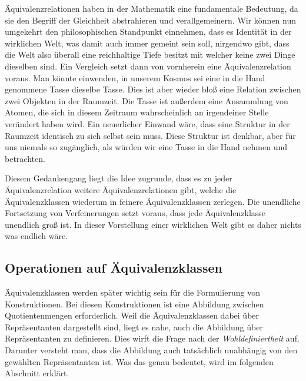 Äquivalenzrelationen haben in der Mathematik eine fundamentale
Bedeutung, da sie den Begriff der Gleichheit abstrahieren und
verallgemeinern. Wir können nun umgekehrt den philosophischen
Standpunkt einnehmen, dass es Identität in der wirklichen Welt, was
damit auch immer gemeint sein soll, nirgendwo gibt, dass die Welt also
überall eine reichhaltige Tiefe besitzt mit welcher keine zwei Dinge
dieselben sind. Ein Vergleich setzt dann von vornherein eine
Äquivalenzrelation voraus. Man könnte einwenden, in unserem Kosmos sei
eine in die Hand genommene Tasse dieselbe Tasse. Dies ist aber wieder
bloß eine Relation zwischen zwei Objekten in der Raumzeit. Die Tasse
ist außerdem eine Ansammlung von Atomen, die sich in diesem Zeitraum
wahrscheinlich an irgendeiner Stelle verändert haben wird. Ein
neuerlicher Einwand wäre, dass eine Struktur in der Raumzeit identisch
zu sich selbst sein muss. Diese Struktur ist denkbar, aber für uns
niemals so zugänglich, als würden wir eine Tasse in die
Hand nehmen und betrachten.

Diesem Gedankengang liegt die Idee zugrunde, dass es zu jeder
Äquivalenzrelation weitere Äquivalenzrelationen gibt, welche
die Äquivalenzklassen wiederum in feinere Äquivalenzklassen zerlegen.
Die unendliche Fortsetzung von Verfeinerungen setzt voraus, dass
jede Äquivalenzklasse unendlich groß ist. In dieser Vorstellung einer
wirklichen Welt gibt es daher nichts was endlich wäre.

\subsection{Operationen auf Äquivalenzklassen}

Äquivalenzklassen werden später wichtig sein für die Formulierung von
Konstruktionen. Bei diesen Konstruktionen ist eine Abbildung
zwischen Quotientenmengen erforderlich. Weil die Äquivalenzklassen
dabei über Repräsentanten dargestellt sind, liegt es nahe, auch
die Abbildung über Repräsentanten zu definieren. Dies wirft die
Frage nach der \emph{Wohldefiniertheit} auf. Darunter versteht man,
dass die Abbildung auch tatsächlich unabhängig von den gewählten
Repräsentanten ist. Was das genau bedeutet, wird im folgenden
Abschnitt erklärt.


